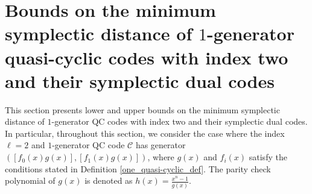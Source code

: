 \documentclass[journal]{IEEEtran}
\newtheorem{theorem}{Theorem}
\begin{document}
%



\section{Bounds on the minimum symplectic distance of $1$-generator quasi-cyclic codes with index two and their symplectic dual codes}\label{sec4}
This section presents lower and upper bounds on the minimum symplectic distance of $1$-generator QC codes with index two and their symplectic dual codes. 
In particular, throughout this section, we consider the case where the index $\ell=2$ and $1$-generator QC code $\mathscr{C}$ has generator $(\left[f_0(x)g(x)\right],\left[f_1(x)g(x)\right])$, where $g(x)$ and $f_i(x)$ satisfy the conditions stated in Definition \ref{one_quasi-cyclic_def}. The parity check polynomial of $g(x)$ is denoted as $h(x)=\frac{x^n-1}{g(x)}$. 
\end{document}
